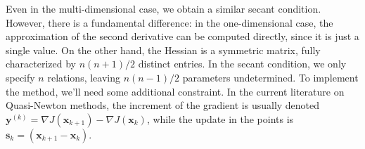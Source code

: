 \documentclass{article}
\numberwithin{equation}{subsection}
\begin{document}
Even in the multi-dimensional case, we obtain a similar secant condition. However, there is a fundamental difference: in the one-dimensional case, the approximation of the second derivative can be computed directly, since it is just a single value. On the other hand, the Hessian is a symmetric matrix, fully characterized by $n(n+1)/2$ distinct entries. In the secant condition, we only specify $n$ relations, leaving $n(n-1)/2$ parameters undetermined. To implement the method, we'll need some additional constraint. In the current literature on Quasi-Newton methods, the increment of the gradient is usually denoted $\textbf{y}^{(k)} = \nabla J(\textbf{x}_{k+1}) - \nabla J(\textbf{x}_k)$, while the update in the points is $\textbf{s}_k = (\textbf{x}_{k+1} - \textbf{x}_k)$. 
\end{document}
